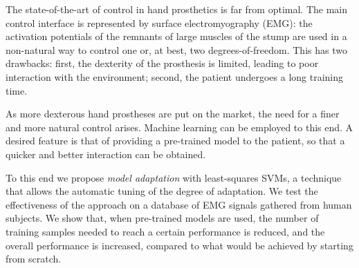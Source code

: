 The state-of-the-art of control in hand prosthetics is far from
optimal. The main control interface is represented by surface
electromyography (EMG): the activation potentials of the remnants of
large muscles of the stump are used in a non-natural way to control
one or, at best, two degrees-of-freedom. This has two drawbacks:
first, the dexterity of the prosthesis is limited, leading to poor
interaction with the environment; second, the patient undergoes a long
training time.

As more dexterous hand prostheses are put on the market, the need
for a finer and more natural control arises. Machine learning can be
employed to this end. A desired feature is that of providing a
pre-trained model to the patient, so that a quicker and better
interaction can be obtained.

To this end we propose \emph{model adaptation} with least-squares SVMs,
a technique that allows the automatic tuning of the degree of adaptation. We test the
effectiveness of the approach on a database of EMG signals gathered from human
subjects.
We show that, when pre-trained models are used, the number of training samples
needed to reach a certain performance is reduced, and the overall performance is
increased, compared to what would be achieved by starting from scratch.
